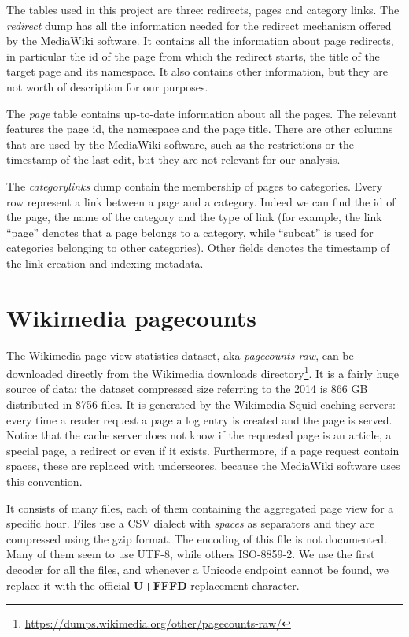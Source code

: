 The tables used in this project are three: redirects, pages and category links.
The \emph{redirect} dump has all the information needed for the redirect mechanism offered by the MediaWiki software.
It contains all the information about page redirects, in particular the id of the page from which the redirect starts, the title of the target page and its namespace.
It also contains other information, but they are not worth of description for our purposes.

The \emph{page} table contains up-to-date information about all the pages.
The relevant features the page id, the namespace and the page title.
There are other columns that are used by the MediaWiki software, such as the restrictions or the timestamp of the last edit, but they are not relevant for our analysis.

The \emph{categorylinks} dump contain the membership of pages to categories.
Every row represent a link between a page and a category.
Indeed we can find the id of the page, the name of the category and the type of link (for example, the link ``page'' denotes that a page belongs to a category, while ``subcat'' is used for categories belonging to other categories).
Other fields denotes the timestamp of the link creation and indexing metadata.

\section{Wikimedia pagecounts}
The Wikimedia page view statistics dataset, aka \emph{pagecounts-raw}, can be downloaded directly from the Wikimedia downloads directory\footnote{\url{https://dumps.wikimedia.org/other/pagecounts-raw/}}.
It is a fairly huge source of data: the dataset compressed size referring to the 2014 is 866 GB distributed in 8756 files.
It is generated by the Wikimedia Squid caching servers: every time a reader request a page a log entry is created and the page is served.
Notice that the cache server does not know if the requested page is an article, a special page, a redirect or even if it exists.
Furthermore, if a page request contain spaces, these are replaced with underscores, because the MediaWiki software uses this convention.

It consists of many files, each of them containing the aggregated page view for a specific hour.
Files use a CSV dialect with \emph{spaces} as separators and they are compressed using the gzip format.
The encoding of this file is not documented.
Many of them seem to use UTF-8, while others ISO-8859-2. %
We use the first decoder for all the files, and whenever a Unicode endpoint cannot be found, we replace it with the official \textbf{U+FFFD} replacement character.


